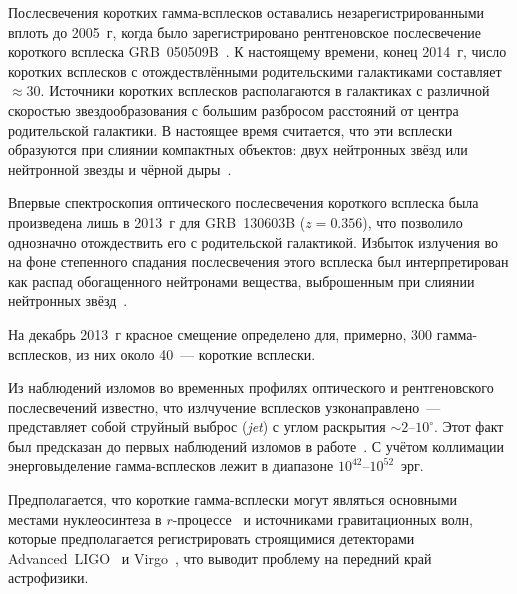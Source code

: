 Послесвечения коротких гамма-всплесков оставались незарегистрированными вплоть 
до 2005~г, когда было зарегистрировано рентгеновское послесвечение короткого 
всплеска GRB~050509B~\citep{Gehrels_2005Natur}. К настоящему времени, конец 2014~г, 
число коротких всплесков с отождествлёнными родительскими галактиками составляет $\approx 30$. 
Источники коротких всплесков располагаются в галактиках с различной скоростью 
звездообразования с большим разбросом расстояний от центра родительской галактики. 
В настоящее время считается, что эти всплески образуются при слиянии компактных 
объектов: двух нейтронных звёзд или нейтронной звезды и чёрной дыры~\citep[см. обзор][]{Berger_2014ARAA}.

Впервые спектроскопия оптического послесвечения короткого всплеска была произведена лишь в 2013~г 
для GRB~130603B ($z = 0.356$), что позволило однозначно отождествить его с 
родительской галактикой. Избыток излучения во на фоне степенного спадания 
послесвечения этого всплеска был интерпретирован как распад обогащенного 
нейтронами вещества, выброшенным при слиянии нейтронных звёзд~\citep{Tanvir_2013Natur}. 

На декабрь 2013~г красное смещение определено для, примерно, 300 гамма-всплесков, 
из них около 40~--- короткие всплески.

Из наблюдений изломов во временных профилях оптического и рентгеновского послесвечений 
известно, что излчучение всплесков узконаправлено~--- представляет собой 
струйный выброс (\textit{jet}) с углом раскрытия $\sim 2$--$10^{\circ}$. 
Этот факт был предсказан до первых наблюдений изломов в работе~\citep{Rhoads_1999ApJ}. 
С учётом коллимации энерговыделение гамма-всплесков лежит в диапазоне $10^{42}$--$10^{52}$~эрг.



Предполагается, что короткие гамма-всплески могут являться основными местами нуклеосинтеза в 
$r$-процессе~\citep{Tanvir_2013Natur} и источниками гравитационных волн, 
которые предполагается регистрировать строящимися детекторами Advanced~LIGO~\citep{Harry_2010CQGra} 
и Virgo~\citep{Accadia_2012JInst}, что выводит проблему на передний край астрофизики.

